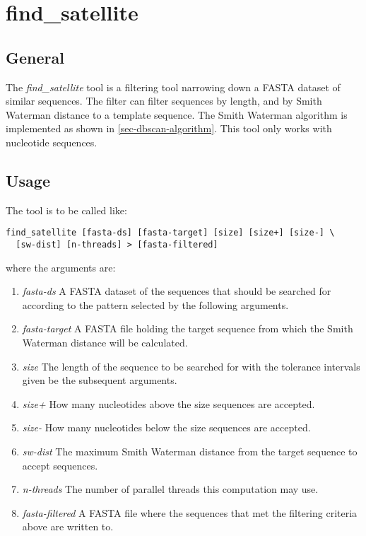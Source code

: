 \section{find\_satellite}

\subsection{General}

The \emph{find\_satellite} tool is a filtering tool narrowing down a FASTA
dataset of similar sequences. The filter can filter sequences by
length, and by Smith Waterman distance to a template sequence. The
Smith Waterman algorithm is implemented as shown in
\ref{sec-dbscan-algorithm}. This tool only works with nucleotide
sequences. 

\subsection{Usage}
The tool is to be called like:
\begin{lstlisting}
find_satellite [fasta-ds] [fasta-target] [size] [size+] [size-] \
  [sw-dist] [n-threads] > [fasta-filtered]
\end{lstlisting}
where the arguments are:
\begin{enumerate}
  \item \emph{fasta-ds} A FASTA dataset of the sequences that should be searched
    for according to the pattern selected by the following arguments.
  \item \emph{fasta-target} A FASTA file holding the target sequence
    from which the Smith Waterman distance will be calculated.
  \item \emph{size} The length of the sequence to be searched for with
    the tolerance intervals given be the subsequent arguments.
  \item \emph{size+} How many nucleotides above the size sequences are
    accepted.
  \item \emph{size-} How many nucleotides below the size sequences are
    accepted.
  \item \emph{sw-dist} The maximum Smith Waterman distance from the
    target sequence to accept sequences.
  \item \emph{n-threads} The number of parallel threads this
    computation may use.
  \item \emph{fasta-filtered} A FASTA file where the sequences that
    met the filtering criteria above are written to. 
\end{enumerate}


